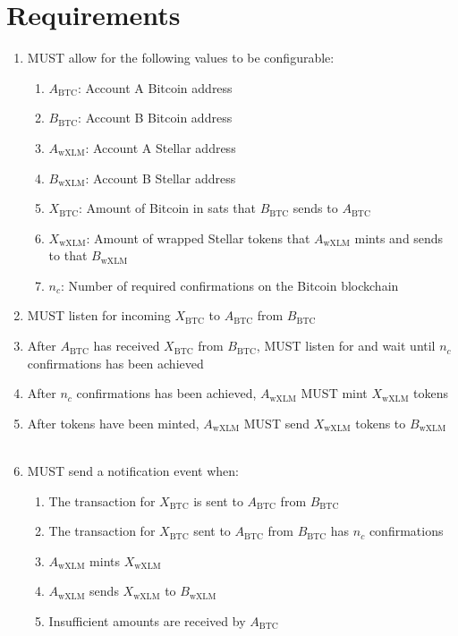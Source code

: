 \section{Requirements}
\begin{enumerate}[noitemsep]

  \item MUST allow for the following values to be configurable:

    \begin{enumerate}[noitemsep]
      \item $A_\mathrm{BTC}$: Account A Bitcoin address
      \item $B_\mathrm{BTC}$: Account B Bitcoin address
      \item $A_\mathrm{wXLM}$: Account A Stellar address
      \item $B_\mathrm{wXLM}$: Account B Stellar address
      \item $X_\mathrm{BTC}$: Amount of Bitcoin in sats that $B_\mathrm{BTC}$ sends to $A_\mathrm{BTC}$
      \item $X_\mathrm{wXLM}$: Amount of wrapped Stellar tokens that $A_\mathrm{wXLM}$ mints and sends to that $B_\mathrm{wXLM}$
      \item $n_c$: Number of required confirmations on the Bitcoin blockchain
    \end{enumerate}

  \item MUST listen for incoming $X_\mathrm{BTC}$ to $A_\mathrm{BTC}$ from $B_\mathrm{BTC}$

  \item After $A_\mathrm{BTC}$ has received $X_\mathrm{BTC}$ from $B_\mathrm{BTC}$, MUST listen for and wait until $n_c$ confirmations has been achieved

  \item After $n_c$ confirmations has been achieved, $A_\mathrm{wXLM}$ MUST mint $X_\mathrm{wXLM}$ tokens

  \item After tokens have been minted, $A_\mathrm{wXLM}$ MUST send $X_\mathrm{wXLM}$ tokens to $B_\mathrm{wXLM}$\\
  \\
  \par

  \item MUST send a notification event when:

    \begin{enumerate}[noitemsep]
      \item The transaction for $X_\mathrm{BTC}$ is sent to $A_\mathrm{BTC}$ from $B_\mathrm{BTC}$
      \item The transaction for $X_\mathrm{BTC}$ sent to $A_\mathrm{BTC}$ from $B_\mathrm{BTC}$ has $n_c$ confirmations
      \item $A_\mathrm{wXLM}$ mints $X_\mathrm{wXLM}$
      \item $A_\mathrm{wXLM}$ sends $X_\mathrm{wXLM}$ to $B_\mathrm{wXLM}$
      \item Insufficient amounts are received by $A_\mathrm{BTC}$
    \end{enumerate}


\end{enumerate}
